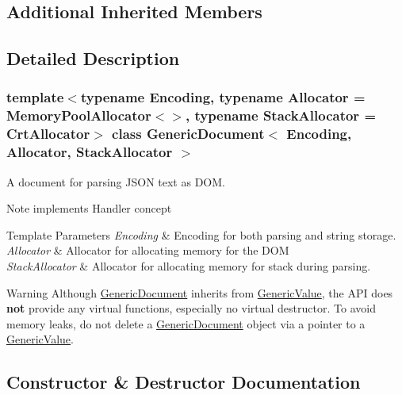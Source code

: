 \subsection*{Additional Inherited Members}


\subsection{Detailed Description}
\subsubsection*{template$<$typename Encoding, typename Allocator = Memory\+Pool\+Allocator$<$$>$, typename Stack\+Allocator = Crt\+Allocator$>$\newline
class Generic\+Document$<$ Encoding, Allocator, Stack\+Allocator $>$}

A document for parsing J\+S\+ON text as D\+OM. 

\begin{DoxyNote}{Note}
implements Handler concept 
\end{DoxyNote}

\begin{DoxyTemplParams}{Template Parameters}
{\em Encoding} & Encoding for both parsing and string storage. \\
\hline
{\em Allocator} & Allocator for allocating memory for the D\+OM \\
\hline
{\em Stack\+Allocator} & Allocator for allocating memory for stack during parsing. \\
\hline
\end{DoxyTemplParams}
\begin{DoxyWarning}{Warning}
Although \hyperlink{a01996}{Generic\+Document} inherits from \hyperlink{a01992}{Generic\+Value}, the A\+PI does {\bfseries not} provide any virtual functions, especially no virtual destructor. To avoid memory leaks, do not {\ttfamily delete} a \hyperlink{a01996}{Generic\+Document} object via a pointer to a \hyperlink{a01992}{Generic\+Value}. 
\end{DoxyWarning}


\subsection{Constructor \& Destructor Documentation}
\mbox{\label{a01996_a3da21e72ec8f26b9da77d86cc1d41cdd}} 
